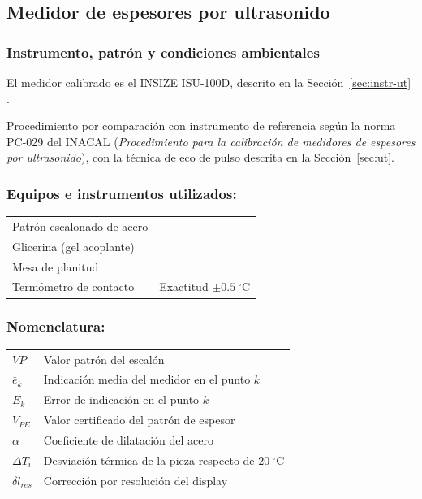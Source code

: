 \subsection{Medidor de espesores por ultrasonido}
\label{sec:ut-calibracion}

\subsubsection{Instrumento, patrón y condiciones ambientales}

El medidor calibrado es el INSIZE ISU-100D, descrito en la
Sección~\ref{sec:instr-ut} \parencite{insize_isu100d}.

\vspace{6pt}
Procedimiento por comparación con instrumento de referencia según la norma PC-029
del INACAL \parencite{inacal_pc029} (\textit{Procedimiento para la calibración de
medidores de espesores por ultrasonido}), con la técnica de eco de pulso descrita
en la Sección~\ref{sec:ut}.

\vspace{12pt}
\subsubsection*{Equipos e instrumentos utilizados:}
\begin{tabular}{ll}
Patrón escalonado de acero & \\[3pt]
Glicerina (gel acoplante)  & \\[3pt]
Mesa de planitud           & \\[3pt]
Termómetro de contacto     & Exactitud $\pm 0.5\ ^\circ\text{C}$
\end{tabular}

\vspace{12pt}
\subsubsection*{Nomenclatura:}
\begin{tabular}{ll}
$VP$        & Valor patrón del escalón\\[3pt]
$\bar e_k$  & Indicación media del medidor en el punto $k$\\[3pt]
$E_k$       & Error de indicación en el punto $k$\\[3pt]
$V_{PE}$    & Valor certificado del patrón de espesor\\[3pt]
$\alpha$    & Coeficiente de dilatación del acero\\[3pt]
$\Delta T_i$ & Desviación térmica de la pieza respecto de $20\ ^\circ\text{C}$\\[3pt]
$\delta l_{res}$ & Corrección por resolución del display
\end{tabular}

